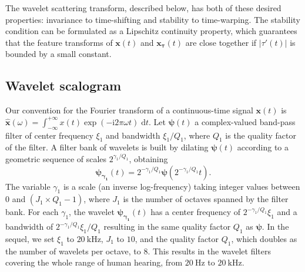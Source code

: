 \documentclass[journal]{IEEEtran}
\begin{document}
The wavelet scattering transform, described below, has both of these desired properties: invariance to time-shifting and stability to time-warping. The stability condition can be formulated as a Lipschitz continuity property, which guarantees that the feature transforms of $\boldsymbol{x}(t)$ and $\boldsymbol{x_\tau}(t)$ are close together if $|\tau'(t)|$ is bounded by a small constant.

\subsection{Wavelet scalogram}
Our convention for the Fourier transform of a continuous-time signal $\boldsymbol{x}(t)$ is $\boldsymbol{\hat{x}}(\omega) = \int_{-\infty}^{+\infty} x(t) \exp(- \mathrm{i} 2\pi \omega t) \; \mathrm{d}t$.
Let $\boldsymbol{\psi}(t)$ a complex-valued band-pass filter of
center frequency $\xi_1$ and bandwidth $\xi_1/Q_1$, where $Q_1$ is the quality factor of the filter.
A filter bank of wavelets is built by dilating $\boldsymbol{\psi}(t)$
according to a geometric sequence of scales $2^{\gamma_1/Q_1}$, obtaining
\begin{equation}
\boldsymbol{\psi_{\gamma_1}}(t) = 2^{-\gamma_1/Q_1} \boldsymbol{\psi}(2^{-\gamma_1/Q_1} t)\mbox{.}
\end{equation}
The variable $\gamma_1$ is a scale (an inverse log-frequency) taking integer values between $0$ and $(J_1 \times Q_1 - 1)$, where $J_1$ is the number of octaves spanned by the filter bank.
For each $\gamma_1$, the wavelet $\boldsymbol{\psi_{\gamma_1}}(t)$
has a center frequency of $2^{-\gamma_1/Q_1}\xi_1$ and a bandwidth of $2^{-\gamma_1/Q_1}\xi_1/Q_1$ resulting in the same quality factor $Q_1$ as $\boldsymbol{\psi}$.
In the sequel, we set $\xi_1$ to $20~\mathrm{kHz}$, $J_1$ to $10$, and the quality factor $Q_1$, which doubles as the number of wavelets per octave, to $8$. This results in the wavelet filters covering the whole range of human hearing, from $20~\mathrm{Hz}$ to $20~\mathrm{kHz}$.
\end{document}
